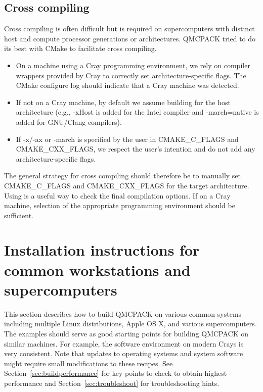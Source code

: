 \subsection{Cross compiling}
Cross compiling is often difficult but is required on supercomputers
with distinct host and compute processor generations or architectures.
QMCPACK tried to do its best with CMake to facilitate cross compiling.

\begin{itemize}
  \item On a machine using a Cray programming environment, we rely on
      compiler wrappers provided by Cray to correctly set architecture-specific
      flags. The CMake configure log should indicate that a
      Cray machine was detected.
  \item If not on a Cray machine, by default we assume building for
    the host architecture (e.g., -xHost is added for the Intel compiler
    and -march=native is added for GNU/Clang compilers).
  \item If -x/-ax or -march is specified by the user in CMAKE\_C\_FLAGS and CMAKE\_CXX\_FLAGS,
    we respect the user's intention and do not add any architecture-specific flags.
\end{itemize}

The general strategy for cross compiling should therefore be to
manually set CMAKE\_C\_FLAGS and CMAKE\_CXX\_FLAGS for the target
architecture. Using  is a useful way to check the
final compilation options.  If on a Cray machine, selection of the
appropriate programming environment should be sufficient.

\section{Installation instructions for common workstations and
  supercomputers}
\label{sec:installexamples}

This section describes how to build QMCPACK on various common systems
including multiple Linux distributions, Apple OS X, and various
supercomputers. The examples should serve as good starting points for
building QMCPACK on similar machines. For example, the software
environment on modern Crays is very consistent. Note that updates to
operating systems and system software might require small modifications
to these recipes. See Section~\ref{sec:buildperformance} for key
points to check to obtain highest performance and
Section~\ref{sec:troubleshoot} for troubleshooting hints.

